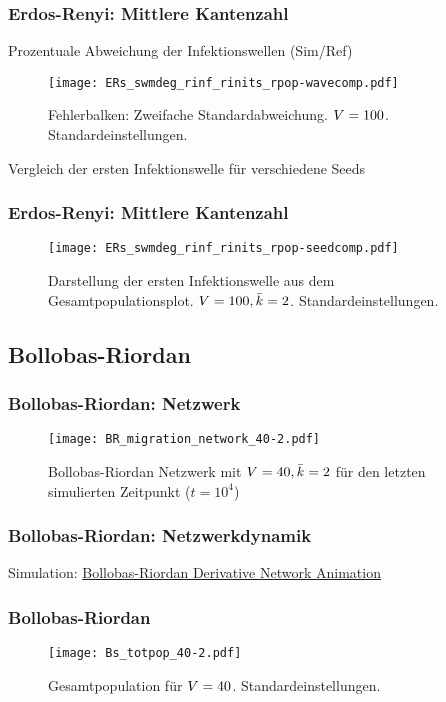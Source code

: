 \begin{frame}[t]
    \frametitle{Erdos-Renyi: Mittlere Kantenzahl}
    Prozentuale Abweichung der Infektionswellen (Sim/Ref)
    \begin{figure}[htpb]
        \centering
        \texttt{[image: ERs\_swmdeg\_rinf\_rinits\_rpop-wavecomp.pdf]}
        \caption{Fehlerbalken: Zweifache Standardabweichung. $V = 100$. Standardeinstellungen.}%
        \label{fig:ERs_swmean_finf_rinit_rpop-wavecomp}
    \end{figure}
\end{frame}
\begin{frame}[t]
    Vergleich der ersten Infektionswelle für verschiedene Seeds
    \frametitle{Erdos-Renyi: Mittlere Kantenzahl}
    \begin{figure}[htpb]
        \centering
        \texttt{[image: ERs\_swmdeg\_rinf\_rinits\_rpop-seedcomp.pdf]}
        \caption{Darstellung der ersten Infektionswelle aus dem Gesamtpopulationsplot. $V = 100, \bar{k}=2$.
        Standardeinstellungen.}%
        \label{fig:ERs_swmdeg_rinf_rinits_rpop-seedcomp}
    \end{figure}
\end{frame}

\subsection{Bollobas-Riordan}
\begin{frame}[t]
    \frametitle{Bollobas-Riordan: Netzwerk}
    \begin{figure}[htpb]
        \centering
        \texttt{[image: BR\_migration\_network\_40-2.pdf]}
        \caption{Bollobas-Riordan Netzwerk mit $V = 40, \bar{k} = 2$ für den letzten
        simulierten Zeitpunkt ($t= 10^{4}$)}%
        \label{fig:BR_migration_network_40-2}
    \end{figure}
\end{frame}
\begin{frame}[c]
    \frametitle{Bollobas-Riordan: Netzwerkdynamik}
    Simulation: \href{run:/figures/animations/BR_animation_40-2.mp4}{Bollobas-Riordan Derivative Network Animation}
\end{frame}
\begin{frame}[t]
    \frametitle{Bollobas-Riordan}
    \begin{figure}[htpb]
        \centering
        \texttt{[image: Bs\_totpop\_40-2.pdf]}
        \caption{Gesamtpopulation für $V = 40$. Standardeinstellungen.}%
        \label{fig:Bs_totpop_40-2}
    \end{figure}
\end{frame}

